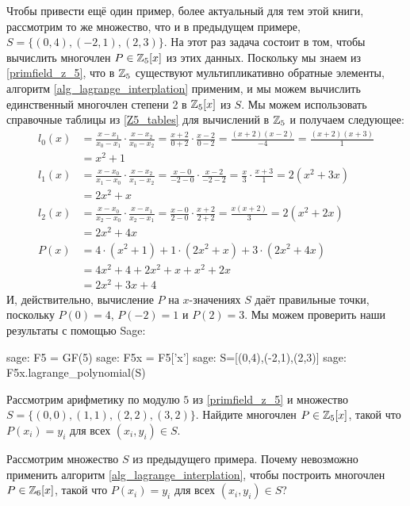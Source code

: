 \begin{example} Чтобы привести ещё один пример, более актуальный для тем этой книги, рассмотрим то же множество, что и в предыдущем примере, $S=\{(0,4),(-2,1),(2,3)\}$. На этот раз задача состоит в том, чтобы вычислить многочлен $P\in\mathbb{Z}_5[x]$ из этих данных. Поскольку мы знаем
из \examplename{} \ref{primfield_z_5}, что в $\mathbb{Z}_5$ существуют мультипликативно обратные элементы, алгоритм \ref{alg_lagrange_interplation} применим, и мы можем вычислить единственный многочлен степени 2 в $\mathbb{Z}_5[x]$ из $S$. Мы можем использовать справочные таблицы из \eqref{Z5_tables} для вычислений в $\mathbb{Z}_5$ и получаем следующее:
\begin{align*}
l_0(x) & = \frac{x-x_1}{x_0-x_1}\cdot\frac{x-x_2}{x_0-x_2}
         = \frac{x+2}{0+2}\cdot\frac{x-2}{0-2}
         =  \frac{(x+2)(x-2)}{-4}
         =  \frac{(x+2)(x+3)}{1}\\
       & =  x^2+1\\
l_1(x) & =  \frac{x-x_0}{x_1-x_0}\cdot\frac{x-x_2}{x_1-x_2}
         = \frac{x-0}{-2-0}\cdot \frac{x-2}{-2-2}
         = \frac{x}{3}\cdot \frac{x+3}{1}
         = 2(x^2+3x)\\
       & =  2x^2+x\\
l_2(x) & = \frac{x-x_0}{x_2-x_0}\cdot\frac{x-x_1}{x_2-x_1}
         = \frac{x-0}{2-0}\cdot\frac{x+2}{2+2}
         = \frac{x(x+2)}{3}
         = 2(x^2+2x)\\
       & = 2x^2+4x\\
P(x)   & = 4\cdot (x^2+1) + 1\cdot (2x^2+x) + 3\cdot (2x^2+4x) \\
       & = 4x^2+4 + 2x^2 +x + x^2+2x\\
       & = 2x^2 +3x +4
\end{align*}
И, действительно, вычисление $P$ на $x$-значениях $S$ даёт правильные точки, поскольку $P(0)=4$, $P(-2)=1$ и $P(2)=3$. Мы можем проверить наши результаты с помощью Sage:
\begin{sagecommandline}
sage: F5 = GF(5)
sage: F5x = F5['x']
sage: S=[(0,4),(-2,1),(2,3)]
sage: F5x.lagrange_polynomial(S)
\end{sagecommandline}
\end{example}
\begin{exercise}
Рассмотрим арифметику по модулю $5$ из \examplename{} \ref{primfield_z_5} и множество
$S=\{(0,0),(1,1),(2,2),(3,2)\}$. Найдите многочлен $P\in\mathbb{Z}_5[x]$, такой что $P(x_i)=y_i$ для всех $(x_i,y_i)\in S$.
\end{exercise}
\begin{exercise}
Рассмотрим множество $S$ из предыдущего примера. Почему невозможно применить алгоритм \ref{alg_lagrange_interplation}, чтобы построить многочлен $P\in \mathbb{Z}_6[x]$, такой что $P(x_i)=y_i$ для всех $(x_i,y_i)\in S$?
\end{exercise}
